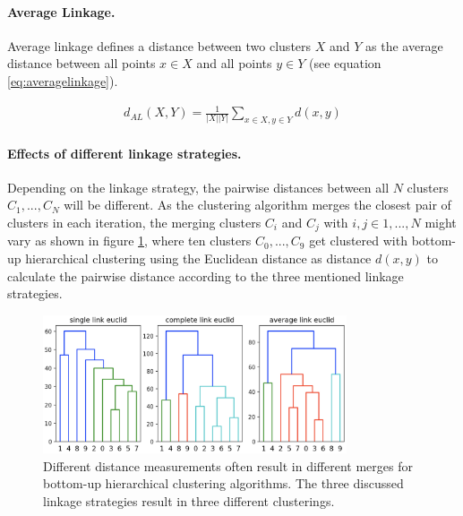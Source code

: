 \paragraph{Average Linkage.}

Average linkage defines a distance between two clusters $X$ and $Y$ as the average distance between all points $x \in X$ and all points $y \in Y$ (see equation \ref{eq:averagelinkage}).

\begin{equation}
    \begin{aligned}
        d_{AL}(X,Y) = \frac{1}{|X||Y|}\sum\limits_{x \in X, y \in Y} d(x,y)
    \end{aligned}
    \label{eq:averagelinkage}
\end{equation}

\paragraph{Effects of different linkage strategies.}

Depending on the linkage strategy, the pairwise distances between all $N$ clusters $C_1, ..., C_N$ will be different. As the clustering algorithm merges the closest pair of clusters in each iteration, the merging clusters $C_i$ and $C_j$ with $i, j \in 1,...,N$ might vary as shown in figure \ref{fig:linkage_effects}, where ten clusters $C_0, ..., C_9$ get clustered with bottom-up hierarchical clustering using the Euclidean distance as distance $d(x,y)$ to calculate the pairwise distance according to the three mentioned linkage strategies.

\begin{figure}[h]
    \centering
    \includegraphics[width=0.8\textwidth]{images/linkage_effects}
    \caption{Different distance measurements often result in different merges for bottom-up hierarchical clustering algorithms. The three discussed linkage strategies result in three different clusterings.}
    \label{fig:linkage_effects}
\end{figure}

